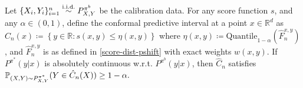 \begin{proposition}\label{coverage_theorem}
Let $\{X_i, Y_i\}_{i =1}^n \overset{\textup{i.i.d.}}{\sim}P^{\pi^b}_{X,Y}$ be the calibration data. For any score function $s$, and any $\alpha \in (0,1)$, define the conformal predictive interval at a point $x\in \mathbb{R}^d$ as $\hat{C}_n(x) \coloneqq \left\{y \in \mathbb{R}: s(x, y) \leq \eta(x,y) \right\}$
where $\eta(x, y) \coloneqq \text{Quantile}_{1-\alpha}( \hat{F}_{n}^{x, y})$, and $\hat{F}_{n}^{x, y}$ is as defined in \eqref{score-dist-pshift} with exact weights $w(x,y)$.
If $P^{\pi^*}(y| x)$ is absolutely continuous w.r.t. $P^{\pi^b}(y| x)$,
then $\hat{C}_{n}$ satisfies
$
    \mathbb{P}_{(X,Y)\sim P^{\pi^*}_{X,Y}}(Y \in \hat{C}_{n}(X)) \geq 1-\alpha \nonumber.
$
\end{proposition}
